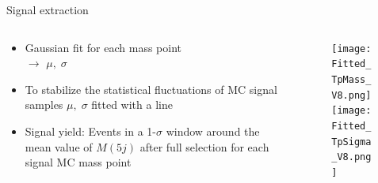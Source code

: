 \begin{frame}{Signal extraction}
\vspace{-1.3cm}
\begin{columns}
\begin{column}{.50\textwidth}
   \begin{block}{}\scriptsize
     \begin{itemize}
     \item Gaussian fit for each mass point \\$\to$ $\mu, \; \sigma$
     \item To stabilize the statistical fluctuations of MC signal samples $\mu, \; \sigma$ fitted with a line
     \item Signal yield: Events in a 1-$\sigma$ window around the mean value of $M(5j)$ after full selection for each signal MC mass point
     \end{itemize}
    \end{block}

\end{column}

\begin{column}{.50\textwidth}
\begin{figure}[!Hhtbp]
  \begin{center}
    \texttt{[image: Fitted\_TpMass\_V8.png]}\\
    \texttt{[image: Fitted\_TpSigma\_V8.png]}
  \end{center}
\end{figure}
\end{column}

\end{columns}


\end{frame}
